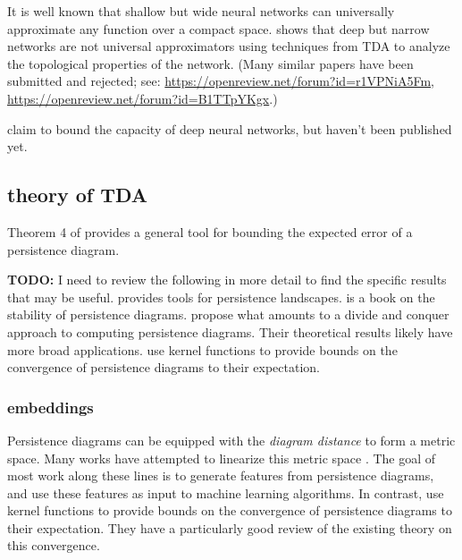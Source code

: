 \documentclass{article}
\newcommand{\defn}[1]{\textit{#1}}
\newcommand{\todo}[1]{{\textbf{TODO:} {#1}}}
\begin{document}
It is well known that shallow but wide neural networks can universally approximate any function over a compact space.
\citet{johnson2019deep} shows that deep but narrow networks are not universal approximators using techniques from TDA to analyze the topological properties of the network.
(Many similar papers have been submitted and rejected; see: 
\url{https://openreview.net/forum?id=r1VPNiA5Fm}, 
\url{https://openreview.net/forum?id=B1TTpYKgx}.)

\citet{guss2018characterizing,ramamurthy2018topological} claim to bound the capacity of deep neural networks,
but haven't been published yet.

\subsection{theory of TDA}

Theorem 4 of \citet{chazal2015convergence} provides a general tool for bounding the expected error of a persistence diagram.

\todo{I need to review the following in more detail to find the specific results that may be useful.}
\citet{chazal2014stochastic} provides tools for persistence landscapes.
\citet{chazal2012structure} is a book on the stability of persistence diagrams.
\citet{chazal2015subsampling} propose what amounts to a divide and conquer approach to computing persistence diagrams.
Their theoretical results likely have more broad applications.
\citet{chazal2018density} use kernel functions to provide bounds on the convergence of persistence diagrams to their expectation.

\subsubsection{embeddings}

Persistence diagrams can be equipped with the \defn{diagram distance} to form a metric space.
Many works have attempted to linearize this metric space \citep[e.g.][]{zielinski2018persistence,le2018persistence,hofer2017deep,kusano2016persistence,carriere2017sliced,cang2017topologynet,anirudh2016riemannian,obayashi2018persistence,adams2017persistence,kwitt2015statistical}.
The goal of most work along these lines is to generate features from persistence diagrams,
and use these features as input to machine learning algorithms.
In contrast, \citet{chazal2018density} use kernel functions to provide bounds on the convergence of persistence diagrams to their expectation.
They have a particularly good review of the existing theory on this convergence.
\end{document}
